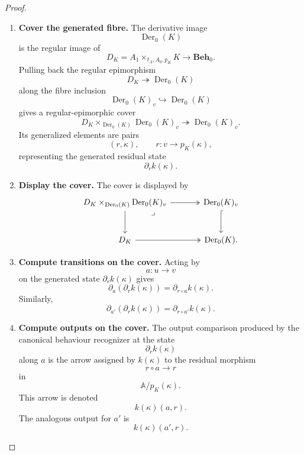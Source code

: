 \begin{proof}
    \leavevmode
    \begin{enumerate}
        \item \textbf{Cover the generated fibre.}
        The derivative image
        \[
            \operatorname{Der}_0(K)
        \]
        is the regular image of
        \[
            D_K=A_1\times_{t_A,A_0,p_K}K
            \to
            \mathbf{Beh}_0.
        \]
        Pulling back the regular epimorphism
        \[
            D_K\twoheadrightarrow \operatorname{Der}_0(K)
        \]
        along the fibre inclusion
        \[
            \operatorname{Der}_0(K)_v
            \hookrightarrow
            \operatorname{Der}_0(K)
        \]
        gives a regular-epimorphic cover
        \[
            D_K\times_{\operatorname{Der}_0(K)}
            \operatorname{Der}_0(K)_v
            \twoheadrightarrow
            \operatorname{Der}_0(K)_v.
        \]
        Its generalized elements are pairs
        \[
            (r,\kappa),
            \qquad
            r:v\to p_K(\kappa),
        \]
        representing the generated residual state
        \[
            \partial_r k(\kappa).
        \]

        \item \textbf{Display the cover.}
        The cover is displayed by
        \[
        \begin{tikzcd}[column sep=large, row sep=large]
            D_K\times_{\operatorname{Der}_0(K)}
            \operatorname{Der}_0(K)_v
                \arrow[r, two heads]
                \arrow[d]
                \arrow[dr, phantom, "\lrcorner", very near start]
            &
            \operatorname{Der}_0(K)_v
                \arrow[d, hook]
            \\
            D_K
                \arrow[r, two heads]
            &
            \operatorname{Der}_0(K).
        \end{tikzcd}
        \]

        \item \textbf{Compute transitions on the cover.}
        Acting by
        \[
            a:u\to v
        \]
        on the generated state \(\partial_r k(\kappa)\) gives
        \[
            \partial_a(\partial_r k(\kappa))
            =
            \partial_{r\circ a}k(\kappa).
        \]
        Similarly,
        \[
            \partial_{a'}(\partial_r k(\kappa))
            =
            \partial_{r\circ a'}k(\kappa).
        \]

        \item \textbf{Compute outputs on the cover.}
        The output comparison produced by the canonical behaviour recognizer at
        the state
        \[
            \partial_r k(\kappa)
        \]
        along \(a\) is the arrow assigned by \(k(\kappa)\) to the residual
        morphism
        \[
            r\circ a\to r
        \]
        in
        \[
            \mathbb A/p_K(\kappa).
        \]
        This arrow is denoted
        \[
            k(\kappa)(a,r).
        \]
        The analogous output for \(a'\) is
        \[
            k(\kappa)(a',r).
        \]


\end{enumerate}
\end{proof}

